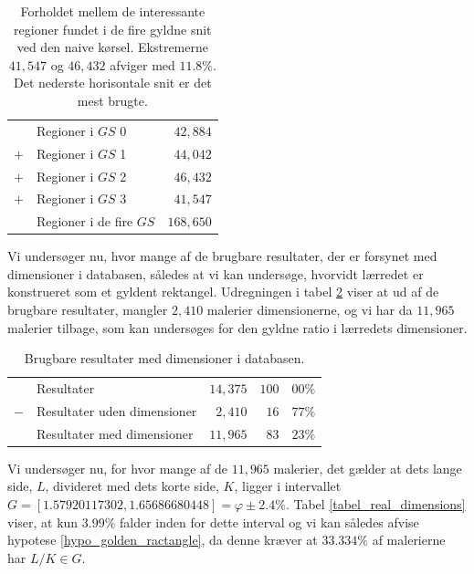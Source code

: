 {\begin{table}[H]
    \centering
    \begin{tabular}{r@{\ \ }p{12em}r}
            & Regioner i $GS$ 0             &  $42,884$ \\
        $+$ & Regioner i $GS$ 1             &  $44,042$ \\
        $+$ & Regioner i $GS$ 2             &  $46,432$ \\
        $+$ & Regioner i $GS$ 3             &  $41,547$ \\\hline
            & Regioner i de fire $GS$       & $168,650$
    \end{tabular}
    \caption[]{Forholdet mellem de interessante regioner fundet i de
    fire gyldne snit ved den naive kørsel. Ekstremerne $41,547$ og
    $46,432$ afviger med $11.8 \%$. Det nederste horisontale snit er det
    mest brugte.}
    \label{tabel_fire_snit}
\end{table}

Vi undersøger nu, hvor mange af de brugbare resultater, der er forsynet
med dimensioner i databasen, således at vi kan undersøge, hvorvidt
lærredet er konstrueret som et gyldent rektangel. Udregningen i tabel
\ref{tabel_med_dimensioner} viser at ud af de brugbare resultater,
mangler $2,410$ malerier dimensionerne, og vi har da $11,965$ malerier
tilbage, som kan undersøges for den gyldne ratio i lærredets
dimensioner.

\begin{table}[H]
    \centering
    \begin{tabular}{r@{\ \ }p{14em}r|r@{.}l}
            & Resultater                     & $14,375$ & $100$ & $00\%$ \\
        $-$ & Resultater uden dimensioner    &  $2,410$ &  $16$ & $77\%$ \\\hline
            & Resultater med dimensioner     & $11,965$ &  $83$ & $23\%$
    \end{tabular}
    \caption[]{Brugbare resultater med dimensioner i databasen.}
    \label{tabel_med_dimensioner}
\end{table}

Vi undersøger nu, for hvor mange af de $11,965$ malerier, det gælder at
dets lange side, $L$, divideret med dets korte side, $K$, ligger i
intervallet $G = [1.57920117302, 1.65686680448] = \varphi \pm 2.4\%$.
Tabel \ref{tabel_real_dimensions} viser, at kun $3.99\%$ falder inden
for dette interval og vi kan således afvise hypotese
\ref{hypo_golden_ractangle}, da denne kræver at $33.334 \%$ af
malerierne har $L/K \in G$.

}
